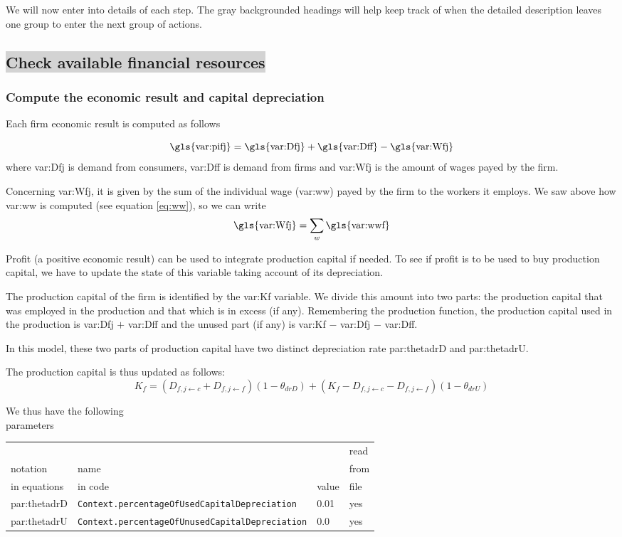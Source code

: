 \documentclass{book}
\begin{document}
We will now enter into details of each step. The gray backgrounded headings will help keep track of when the detailed description leaves one group to enter the next group of actions.

\subsection*{\colorbox{lightgray}{Check available financial resources}}
\subsubsection{Compute the economic result and capital depreciation}
Each firm economic result is computed as follows

\[
	\textnormal{\gls{var:pifj}} =\textnormal{\gls{var:Dfj}}+\textnormal{\gls{var:Dff}}-\textnormal{\gls{var:Wfj}}
\]
where \gls{var:Dfj} is demand from consumers, \gls{var:Dff} is demand from firms and \gls{var:Wfj} is the amount of wages payed by the firm.

Concerning \gls{var:Wfj}, it is given by the sum of the individual wage (\gls{var:ww}) payed by the firm to the workers it employs. We saw above how \gls{var:ww} is computed (see equation \ref{eq:ww}), so we can write
\[
	\textnormal{\gls{var:Wfj}}=\sum_w \textnormal{\gls{var:wwf}}
\]


Profit (a positive economic result) can be used to integrate production capital if needed. To see if profit is to be used to buy production capital, we have to update the state of this variable taking account of its depreciation.

The production capital of the firm is identified by the \gls{var:Kf} variable. We divide this amount into two parts: the production capital that was employed in the production and that which is in excess (if any). Remembering the production function, the production capital used in the production is \gls{var:Dfj} $+$ \gls{var:Dff} and the unused part (if any) is \gls{var:Kf} $-$ \gls{var:Dfj} $-$ \gls{var:Dff}.


In this model, these two parts of production capital have two distinct depreciation rate \gls{par:thetadrD} and \gls{par:thetadrU}.

The production capital is thus updated as follows:
\[
	K_f=(D_{f,j\leftarrow c}+D_{f,j\leftarrow f})(1-\theta_{drD})+(K_f-D_{f,j\leftarrow c}-D_{f,j\leftarrow f})(1-\theta_{drU})
\]

We thus have the following\\
parameters\\
\begin{tabular}{l l l l}
	\hline
	& &&read\\
	notation& name &&from\\
	in equations& in code&value&file\\
	\hline
	\hline
 \gls{par:thetadrD}&\verb+Context.percentageOfUsedCapitalDepreciation+&0.01&yes\\
 \gls{par:thetadrU}&\verb+Context.percentageOfUnusedCapitalDepreciation+&0.0&yes\\
	\hline
\end{tabular}
\end{document}
